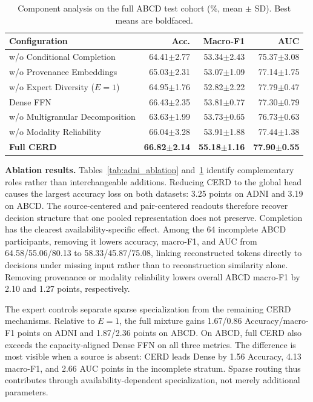 \documentclass[a4paper,fleqn]{cas-dc}
\begin{document}
\begin{table}[t]
\centering
\caption{Component analysis on the full ABCD test cohort (\%, mean $\pm$ SD). Best means are boldfaced.}
\label{tab:abcd_ablation}
\setlength{\tabcolsep}{2.5pt}
\renewcommand{\arraystretch}{1.06}
\scriptsize
\begin{tabular*}{\columnwidth}{@{\extracolsep{\fill}}lrrr@{}}
\toprule
\textbf{Configuration} & \textbf{Acc.} & \textbf{Macro-F1} & \textbf{AUC} \\
\midrule
w/o Conditional Completion & 64.41$\pm$2.77 & 53.34$\pm$2.43 & 75.37$\pm$3.08 \\
w/o Provenance Embeddings & 65.03$\pm$2.31 & 53.07$\pm$1.09 & 77.14$\pm$1.75 \\
w/o Expert Diversity ($E=1$) & 64.95$\pm$1.76 & 52.82$\pm$2.22 & 77.79$\pm$0.47 \\
Dense FFN & 66.43$\pm$2.35 & 53.81$\pm$0.77 & 77.30$\pm$0.79 \\
w/o Multigranular Decomposition & 63.63$\pm$1.99 & 53.73$\pm$0.65 & 76.73$\pm$0.63 \\
w/o Modality Reliability & 66.04$\pm$3.28 & 53.91$\pm$1.88 & 77.44$\pm$1.38 \\
\textbf{Full CERD} & \textbf{66.82$\pm$2.14} & \textbf{55.18$\pm$1.16} & \textbf{77.90$\pm$0.55} \\
\bottomrule
\end{tabular*}
\end{table}

\noindent\textbf{Ablation results.}
Tables~\ref{tab:adni_ablation} and~\ref{tab:abcd_ablation} identify complementary roles rather than interchangeable additions. Reducing CERD to the global head causes the largest accuracy loss on both datasets: 3.25 points on ADNI and 3.19 on ABCD. The source-centered and pair-centered readouts therefore recover decision structure that one pooled representation does not preserve. Completion has the clearest availability-specific effect. Among the 64 incomplete ABCD participants, removing it lowers accuracy, macro-F1, and AUC from 64.58/55.06/80.13 to 58.33/45.87/75.08, linking reconstructed tokens directly to decisions under missing input rather than to reconstruction similarity alone. Removing provenance or modality reliability lowers overall ABCD macro-F1 by 2.10 and 1.27 points, respectively.

The expert controls separate sparse specialization from the remaining CERD mechanisms. Relative to \(E=1\), the full mixture gains 1.67/0.86 Accuracy/macro-F1 points on ADNI and 1.87/2.36 points on ABCD. On ABCD, full CERD also exceeds the capacity-aligned Dense FFN on all three metrics. The difference is most visible when a source is absent: CERD leads Dense by 1.56 Accuracy, 4.13 macro-F1, and 2.66 AUC points in the incomplete stratum. Sparse routing thus contributes through availability-dependent specialization, not merely additional parameters.
\end{document}
